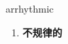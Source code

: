 
\begin{frame}
{\huge arrhythmic}
\begin{center}
\begin{enumerate}\Large
  \item \textbf{不规律的}
\end{enumerate}
\end{center}
\end{frame}
